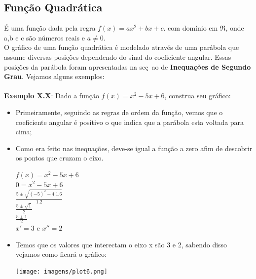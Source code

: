 \documentclass[a4paper,12pt,twoside,BCOR=10mm]{scrbook}
\begin{document}
\begin{titlepage}
\subsection{Função Quadrática}
É uma função dada pela regra $f(x) = ax^{2} + bx + c$. com domínio em $\Re$, onde a,b e c são números reais e $a \neq 0$.\\O gráfico de uma função quadrática é modelado através de uma parábola que assume diversas posições dependendo do sinal do coeficiente angular. Essas posições da parábola foram apresentadas na seç~ao de \textbf{Inequações de Segundo Grau}. Vejamos alguns exemplos:
\\
\\
\textbf{Exemplo X.X}: Dado a função $f(x) = x^{2} - 5x + 6$, construa seu gráfico: 
\begin{itemize}
\item Primeiramente, seguindo as regras de ordem da função, vemos que o coeficiente angular é positivo o que indica que a parábola esta voltada para cima;
\item Como era feito nas inequações, deve-se igual a função a zero afim de descobrir os pontos que cruzam o eixo.
\begin{center}
$f(x) = x^{2} - 5x + 6$\\
$0 = x^{2} - 5x + 6$\\
$\frac{5 \pm \sqrt{(-5)^{2} - 4.1.6}}{1.2}$\\
$\frac{5 \pm \sqrt{1}}{2}$\\
$\frac{5 \pm 1}{2}$\\
$x' = 3$ e $x'' = 2$
\end{center}
\item Temos que os valores que interectam o eixo x são 3 e 2, sabendo disso vejamos como ficará o gráfico:
\begin{center}
\texttt{[image: imagens/plot6.png]}
\end{center}
\end{itemize}


\end{titlepage}
\end{document}
